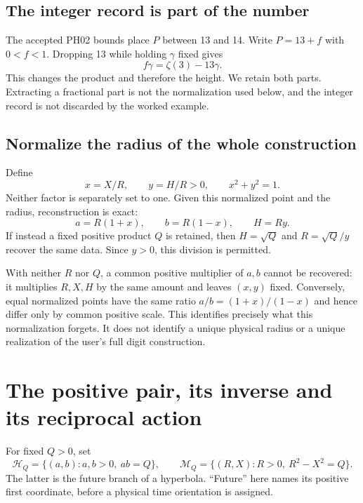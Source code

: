 \documentclass[11pt,a4paper]{article}
\begin{document}
\subsection{The integer record is part of the number}
The accepted PH02 bounds place $P$ between 13 and 14. Write $P=13+f$ with $0<f<1$. Dropping 13 while holding $\gamma$ fixed gives
\begin{equation}
 f\gamma=\zeta(3)-13\gamma.
 \label{eq:integer}
\end{equation}
This changes the product and therefore the height. We retain both parts. Extracting a fractional part is not the normalization used below, and the integer record is not discarded by the worked example.

\subsection{Normalize the radius of the whole construction}
Define
\begin{equation}
 x=X/R,\qquad y=H/R>0,\qquad x^2+y^2=1.
 \label{eq:normalize}
\end{equation}
Neither factor is separately set to one. Given this normalized point and the radius, reconstruction is exact:
\begin{equation}
 a=R(1+x),\qquad b=R(1-x),\qquad H=Ry.
 \label{eq:radiusinverse}
\end{equation}
If instead a fixed positive product $Q$ is retained, then $H=\sqrt Q$ and $R=\sqrt Q/y$ recover the same data. Since $y>0$, this division is permitted.

With neither $R$ nor $Q$, a common positive multiplier of $a,b$ cannot be recovered: it multiplies $R,X,H$ by the same amount and leaves $(x,y)$ fixed. Conversely, equal normalized points have the same ratio $a/b=(1+x)/(1-x)$ and hence differ only by common positive scale. This identifies precisely what this normalization forgets. It does not identify a unique physical radius or a unique realization of the user's full digit construction.

\section{The positive pair, its inverse and its reciprocal action}
\label{sec:pair}
For fixed $Q>0$, set
\begin{equation}
 \mathcal H_Q=\{(a,b):a,b>0,\ ab=Q\},\qquad
 \mathcal M_Q=\{(R,X):R>0,\ R^2-X^2=Q\}.
 \label{eq:domains}
\end{equation}
The latter is the future branch of a hyperbola. ``Future'' here names its positive first coordinate, before a physical time orientation is assigned.
\end{document}
